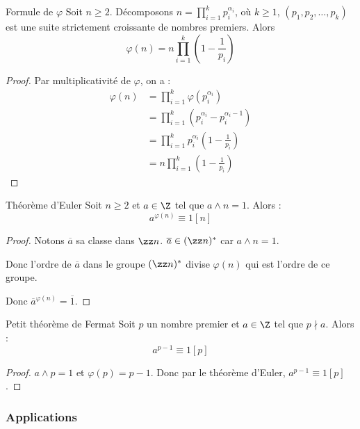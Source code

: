 \begin{theoreme}{Formule de $\varphi$}{}
    Soit $n \geqslant 2$. Décomposons $\displaystyle n = \prod_{i = 1}^k p_i^{\alpha_i}$, où 
    $k \geqslant 1$, $(p_1, p_2, \ldots, p_k)$ est une suite strictement croissante de nombres premiers. 
    Alors \[\varphi(n) = n \prod_{i = 1}^k \left(1 - \frac 1 {p_i}\right)\]
\end{theoreme}

\begin{proof}
    Par multiplicativité de $\varphi$, on a :
    \begin{align*}
        \varphi(n) & = \prod_{i = 1}^k \varphi(p_i^{\alpha_i}) \\
        & = \prod_{i = 1}^k \left(p_i^{\alpha_i} - p_i^{\alpha_i - 1}\right) \\
        & = \prod_{i = 1}^k p_i^{\alpha_i} \left( 1 - \frac 1 {p_i} \right) \\
        & = n \prod_{i = 1}^k \left(1 - \frac 1 {p_i}\right)
    \end{align*}
\end{proof}

\begin{theoreme}{Théorème d'Euler}{}
    Soit $n \geqslant 2$ et $a \in \Z$ tel que $a \wedge n = 1$.
    Alors : \[a^{\varphi(n)} \equiv 1 [n]\]
\end{theoreme}

\begin{proof}
    Notons $\overline a $ sa classe dans $\zz n$. $\overline a \in (\zz n)^*$ car 
    $a \wedge n = 1$.

    Donc l'ordre de $\overline a$ dans le groupe $(\zz n)^*$ divise $\varphi(n)$ qui 
    est l'ordre de ce groupe.

    Donc $\overline a^{\varphi(n)} = \overline 1$.
\end{proof}

\begin{corollaire}{Petit théorème de Fermat}{}
    Soit $p$ un nombre premier et $a \in \Z$ tel que $p \nmid a$.
    Alors : \[a^{p - 1} \equiv 1 [p]\]
\end{corollaire}

\begin{proof}
    $a \wedge p = 1$ et $\varphi(p) = p - 1$.
    Donc par le théorème d'Euler, $a^{p - 1} \equiv 1 [p]$.
\end{proof}

\subsubsection{Applications}

